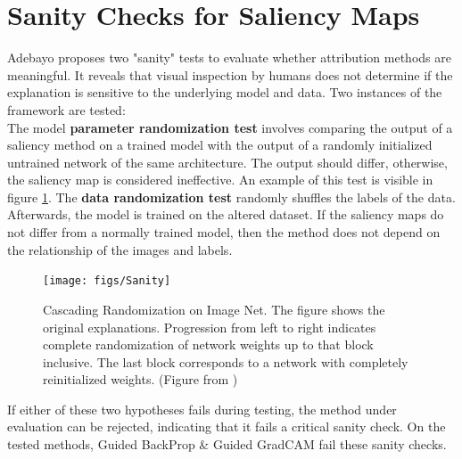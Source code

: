 \section{Sanity Checks for Saliency Maps}

Adebayo \cite{adebayo2020sanity} proposes two "sanity" tests to evaluate whether attribution methods are meaningful. It reveals that visual inspection by humans does not determine if the explanation is sensitive to the underlying model and data. Two instances of the framework are tested:
\\
The model \textbf{parameter randomization test} involves comparing the output of a saliency method on a trained model with the output of a randomly initialized untrained network of the same architecture. The output should differ, otherwise, the saliency map is considered ineffective. An example of this test is visible in figure \ref{fig:Sanity}. The \textbf{data randomization test} randomly shuffles the labels of the data. Afterwards, the model is trained on the altered dataset. If the saliency maps do not differ from a normally trained model, then the method does not depend on the relationship of the images and labels.\\
\begin{figure}[H]
	\centering
	\texttt{[image: figs/Sanity]}
	\caption[Cascading Randomization on Image Net]{Cascading Randomization on Image Net. The figure shows the original explanations. Progression from left to right indicates complete randomization of network weights up to that block inclusive. The last block corresponds to a network with completely reinitialized weights. (Figure from \cite{adebayo2020sanity})}
	\label{fig:Sanity}
\end{figure}
If either of these two hypotheses fails during testing, the method under evaluation can be rejected, indicating that it fails a critical sanity check. On the tested methods, Guided BackProp \& Guided GradCAM fail these sanity checks.



